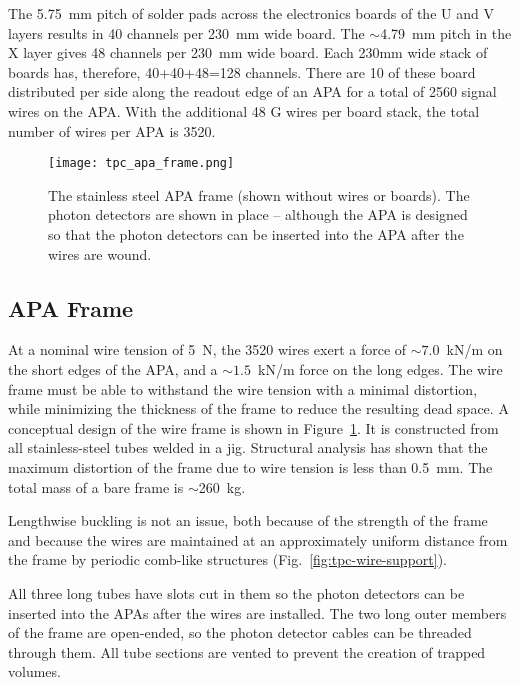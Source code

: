 The 5.75~mm pitch of solder pads across the electronics boards of the U and V layers results in 40 channels per 230~mm wide board.  The $\sim$4.79~mm pitch in the X layer gives 48 channels per 230~mm wide board.  Each 230mm wide stack of boards has, therefore, 40+40+48=128 channels.  There are 10 of these board distributed per side along the readout edge of an APA for a total of 2560 signal wires on the APA.  With the additional 48 G wires per board stack, the total number of wires per APA is 3520.




\begin{figure}[htpb]
\centering
\texttt{[image: tpc\_apa\_frame.png]}
\caption[Conceptual design of a wire frame]{The stainless steel APA frame (shown without wires or boards). The photon detectors are shown in place – although the APA is designed so that the photon detectors can be inserted into the APA after the wires are wound. }
\label{fig:tpc-wire-frame}
\end{figure}

\subsection{APA Frame}

At a nominal wire tension of 5~N, the 3520 wires exert a force of 
$\sim 7.0$~kN/m on the short edges of the APA, and a 
$\sim 1.5 $~kN/m force on the long edges. The wire 
frame must be able to withstand the wire tension with a minimal 
distortion, while minimizing the thickness of the 
frame to reduce the resulting dead space. A conceptual design 
of the wire frame is shown in Figure~\ref{fig:tpc-wire-frame}.  
It is constructed from all stainless-steel tubes welded in a jig.  
Structural analysis has shown that the maximum distortion of the frame due to wire tension is less than 0.5~mm. The total mass of a bare frame is $\sim$260~kg.

Lengthwise buckling is not an issue, both because of the strength of the frame and because the wires are maintained at an approximately uniform distance from the frame by periodic comb-like structures (Fig.~\ref{fig:tpc-wire-support}).

All three long tubes have slots cut in them so the photon detectors can be inserted into the APAs after the wires are installed.  The two long outer members of the frame are open-ended, so the photon detector cables can be threaded through them.  All tube sections are vented to prevent the creation of trapped volumes.



